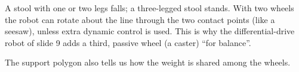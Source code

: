 \documentclass[11pt,a4paper]{article}
\theoremstyle{definition}
\newtheorem{algorithm}[definition]{Algorithm}
\theoremstyle{plain}
\newtheorem{lemma}[definition]{Lemma}
\theoremstyle{remark}
\begin{document}
\begin{intuition}
A stool with one or two legs falls; a three-legged stool stands. With two wheels the robot can rotate about the line through the two contact points (like a seesaw), unless extra dynamic control is used. This is why the differential-drive robot of slide 9 adds a third, passive wheel (a caster) ``for balance''.
\end{intuition}

The support polygon also tells us how the weight is shared among the wheels.


\end{document}
